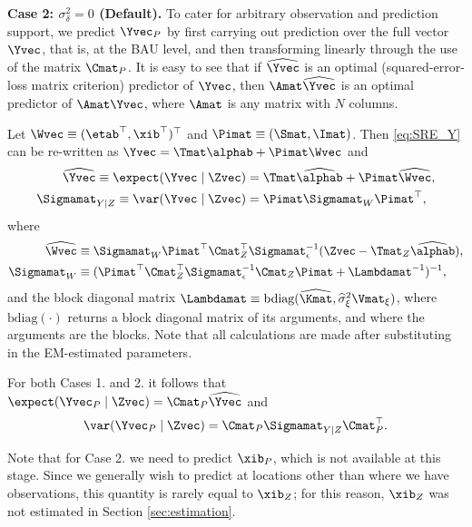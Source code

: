{\bf Case 2: $\sigma^2_\delta = 0$ (Default).} To cater for arbitrary observation and prediction support, we predict $\Yvec_P$ by first carrying out prediction over the full vector $\Yvec$, that is, at the BAU level, and then transforming linearly through the use of the matrix $\Cmat_P$. It is easy to see that if $\widehat\Yvec$ is an optimal (squared-error-loss matrix criterion) predictor of $\Yvec$, then $\Amat\widehat\Yvec$ is an optimal predictor of $\Amat\Yvec$, where $\Amat$ is any matrix with $N$ columns.

Let $\Wvec \equiv (\etab^\top,\xib^\top)^\top$ and $\Pimat \equiv (\Smat,\Imat)$. Then \eqref{eq:SRE_Y} can be re-written as $\Yvec = \Tmat\alphab + \Pimat\Wvec$ and
\begin{align}
\widehat\Yvec \equiv \expect(\Yvec \mid \Zvec) &= \Tmat\widehat\alphab + \Pimat\widehat\Wvec, \nonumber \\
\Sigmamat_{Y \mid Z} \equiv \var(\Yvec \mid \Zvec) &= \Pimat \Sigmamat_W\Pimat^\top, \label{eq:Sigma_YZ}
\end{align}
where
\begin{align*}
\widehat\Wvec &\equiv \Sigmamat_W\Pimat^\top\Cmat_Z^\top\Sigmamat_\epsilon^{-1}(\Zvec - \Tmat_Z\widehat\alphab),\\%
\Sigmamat_W &\equiv (\Pimat^\top \Cmat_Z^\top \Sigmamat_\epsilon^{-1} \Cmat_Z \Pimat + \Lambdamat^{-1})^{-1},\\%
\end{align*}
and the block diagonal matrix $\Lambdamat \equiv \textrm{bdiag}(\widehat\Kmat,\widehat\sigma^{2}_\xi\Vmat_{\xi})$, where $\textrm{bdiag}(\cdot)$ returns a block diagonal matrix of its arguments, and where the arguments are the blocks. Note that all calculations are made after substituting in the EM-estimated parameters.

For both Cases 1. and 2. it follows that $\expect(\Yvec_P \mid \Zvec) = \Cmat_P\widehat\Yvec$ and
\begin{equation*}%
\var(\Yvec_P \mid \Zvec) = \Cmat_P \Sigmamat_{Y \mid Z} \Cmat_P^\top.
\end{equation*}

Note that for Case 2. we need to predict $\xib_P$, which is not available at this stage. Since we generally wish to predict at locations other than where we have observations, this quantity is rarely equal to $\xib_Z$; for this reason, $\xib_Z$ was not estimated in Section \ref{sec:estimation}.


